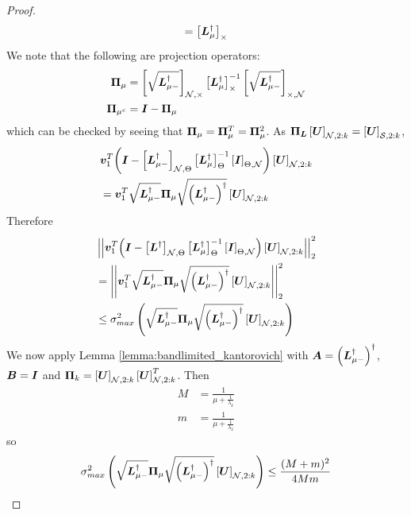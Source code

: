 \begin{proof}
\begin{equation}
     = \msub[\Theta]{\matr{L}^{\dagger}_{\mu}}
\end{equation}
    We note that the following are projection operators:
    \begin{align}
        \proj{\mu} &= \msub[N,\Theta]{\sqrt{\matr{L}_{\mu-}^{\dagger}}}\msub[\Theta]{\matr{L}^{\dagger}_{\mu}}^{-1} \msub[\Theta,N]{\sqrt{\matr{L}_{\mu-}^{\dagger}}} \\
        \projgen{\mu^{c}} &= \matr{I} - \proj{\mu}
    \end{align}
    which can be checked by seeing that $\proj{\mu} = \proj{\mu}^{T} = \proj{\mu}^{2}$.
As $\projgen{\matr{L}}\msubgen[\set{N},2:k]{\matr{U}} = \msubgen[\set{S},2:k]{\matr{U}}$,
\begin{align} 
    &{\vect{v}_{1}^{T}{\left( \matr{I} - \msubgen[\set{N},\Theta]{\matr{L}_{\mu -}^{\dagger}} \msubgen[\Theta]{ \matr{L}_{\mu}^{\dagger}}^{-1}\msubgen[\Theta,\set{N}]{\matr{I}}\right)\msubgen[\set{N},2:k]{\matr{U}}}} \\
    &=\vect{v}_{1}^{T}\sqrt{\matr{L}^{\dagger}_{\mu-}}\proj{\mu}\sqrt{\left(\matr{L}^{\dagger}_{\mu-}\right)^{\dagger}} \msubgen[\set{N},2:k]{\matr{U}}
\end{align}
Therefore
\begin{align}
    &\sqnormvec{\vect{v}_{1}^{T}{\left( \matr{I} - \msubgen[\set{N},\Theta]{\matr{L}^{\dagger}} \msubgen[\Theta]{ \matr{L}_{\mu}^{\dagger}}^{-1}\msubgen[\Theta,\set{N}]{\matr{I}}\right)\msubgen[\set{N},2:k]{\matr{U}}}} \\
    &= \sqnormvec{ \vect{v}_{1}^{T}\sqrt{\matr{L}^{\dagger}_{\mu-}}\proj{\mu}\sqrt{\left(\matr{L}^{\dagger}_{\mu-}\right)^{\dagger}} \msubgen[\set{N},2:k]{\matr{U}}} \\
    &\leq \sigma_{max}^{2}\left(\sqrt{\matr{L}^{\dagger}_{\mu-}}\proj{\mu}\sqrt{\left(\matr{L}^{\dagger}_{\mu-}\right)^{\dagger}} \msubgen[\set{N},2:k]{\matr{U}} \right)
\end{align}
We now apply Lemma \ref{lemma:bandlimited_kantorovich} with $\bm{A} = {\left(\bm{L}^{\dagger}_{\mu-}\right)^{\dagger}}$, $\bm{B}=\bm{I}$ and $\projgen{k} = \msubgen[\set{N},2:k]{\matr{U}}\msubgen[\set{N},2:k]{\matr{U}}^{T}$. Then
\begin{align}
    M &= \frac{1}{\mu + \frac{1}{\lambda_{k}}} \\
    m &= \frac{1}{\mu + \frac{1}{\lambda_{2}}}
\end{align}
so
\begin{align}
\sigma_{max}^{2}\left(\sqrt{\matr{L}^{\dagger}_{\mu-}}\proj{\mu}\sqrt{\left(\matr{L}^{\dagger}_{\mu-}\right)^{\dagger}} \msubgen[\set{N},2:k]{\matr{U}} \right) \leq \frac{(M+m)^{2}}{4Mm} 

\end{align}
\end{proof}
